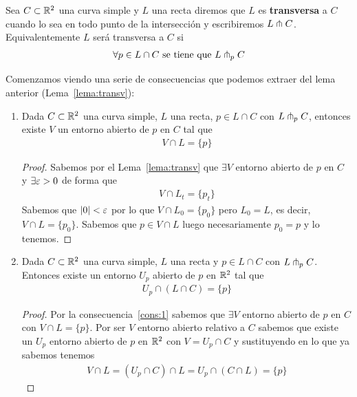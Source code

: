\begin{definicion}\label{def:transv}
    Sea $C\subset \mathbb{R}^2$ una curva simple y $L$ una recta diremos que $L$ es \textbf{transversa} a $C$ cuando lo sea en todo punto de la intersección y escribiremos $L \pitchfork C$. Equivalentemente $L$ será transversa a $C$ si
    \begin{gather*}
        \forall p\in L\cap C \text{ se tiene que } L \pitchfork_p C
    \end{gather*}
\end{definicion}

\begin{observacion}
    Comenzamos viendo una serie de consecuencias que podemos extraer del lema anterior (Lema~\ref{lema:transv}):
    \begin{enumerate}
        \item\label{cons:1} Dada $C\subset \mathbb{R}^2$ una curva simple, $L$ una recta, $p\in L \cap C $ con $L \pitchfork_p C$, entonces existe $V$ un entorno abierto de $p$ en $C$ tal que 
        \begin{gather*}
            V \cap L = \{p\}
        \end{gather*}
        \begin{proof}
            Sabemos por el Lema~\ref{lema:transv} que $\exists V$ entorno abierto de $p$ en $C$ y $\exists \varepsilon>0$ de forma que 
            \begin{gather*}
                V \cap L_t = \{p_t\}
            \end{gather*}
            Sabemos que $|0|<\varepsilon$ por lo que $V\cap L_0 = \{p_0\}$ pero $L_0=L$, es decir, $V\cap L=\{p_0\}$. Sabemos que $p\in V\cap L$ luego necesariamente $p_0=p$ y lo tenemos.
        \end{proof}
        \item\label{cons:2} Dada $C\subset \mathbb{R}^2$ una curva simple, $L$ una recta y $p\in L\cap C$ con $L\pitchfork_pC$. Entonces existe un entorno $U_p$ abierto de $p$ en $\mathbb{R}^2$ tal que 
        \begin{gather*}
            U_p \cap (L\cap C) = \{p\}
        \end{gather*}
        \begin{proof}
            Por la consecuencia~\ref{cons:1} sabemos que $\exists V$ entorno abierto de $p$ en $C$ con $V\cap L = \{p\}$. Por ser $V$ entorno abierto relativo a $C$ sabemos que existe un $U_p$ entorno abierto de $p$ en $\mathbb{R}^2$ con $V=U_p\cap C$ y sustituyendo en lo que ya sabemos tenemos
            \begin{gather*}
                V\cap L =(U_p \cap C)\cap L = U_p \cap (C\cap L) = \{p\}
            \end{gather*}
        \end{proof}


\end{enumerate}
\end{observacion}
